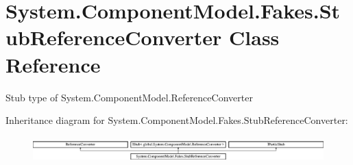\hypertarget{class_system_1_1_component_model_1_1_fakes_1_1_stub_reference_converter}{\section{System.\-Component\-Model.\-Fakes.\-Stub\-Reference\-Converter Class Reference}
\label{class_system_1_1_component_model_1_1_fakes_1_1_stub_reference_converter}
}


Stub type of System.\-Component\-Model.\-Reference\-Converter 


Inheritance diagram for System.\-Component\-Model.\-Fakes.\-Stub\-Reference\-Converter\-:\begin{figure}[H]
\begin{center}
\leavevmode
\includegraphics[height=1.003584cm]{class_system_1_1_component_model_1_1_fakes_1_1_stub_reference_converter}
\end{center}
\end{figure}
